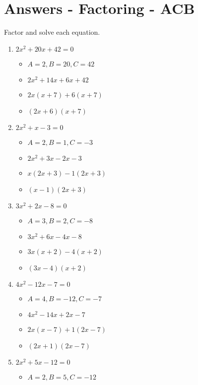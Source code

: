 \section{Answers - Factoring - ACB}
Factor and solve each equation. \\
\begin{enumerate}
\item $2x^{2} + 20x + 42 = 0$
  \begin{itemize}
  \item $A=2, B=20, C=42$
  \item $2x^{2}+14x+6x+42$
  \item $2x(x+7)+6(x+7)$
  \item $(2x+6)(x+7)$
  \end{itemize}
\item $2x^{2} + x - 3 = 0$
  \begin{itemize}
  \item $A=2, B=1, C=-3$
  \item $2x^{2}+3x-2x-3$
  \item $x(2x+3)-1(2x+3)$
  \item $(x-1)(2x+3)$
  \end{itemize}
\item $3x^{2} + 2x - 8 = 0$
  \begin{itemize}
  \item $A=3, B=2, C=-8$
  \item $3x^{2}+6x-4x-8$
  \item $3x(x+2)-4(x+2)$
  \item $(3x-4)(x+2)$
  \end{itemize}
\item $4x^{2} - 12x - 7 = 0$
  \begin{itemize}
  \item $A=4, B=-12, C=-7$
  \item $4x^{2}-14x+2x-7$
  \item $2x(x-7)+1(2x-7)$
  \item $(2x+1)(2x-7)$
  \end{itemize}
\item $2x^{2} + 5x - 12 = 0$
  \begin{itemize}
  \item $A=2, B=5, C=-12$

\end{itemize}
\end{enumerate}
